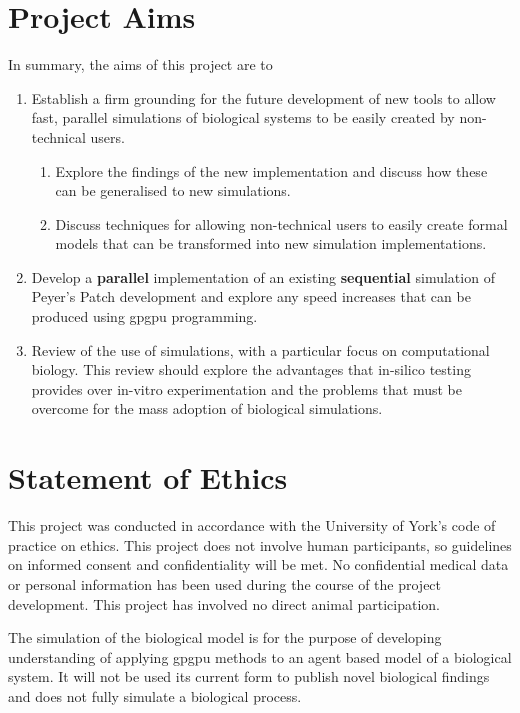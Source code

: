 \documentclass{UoYCSproject}
\begin{document}
\section{Project Aims}
In summary, the aims of this project are to
\begin{enumerate}
	\item Establish a firm grounding for the future development of new tools to allow fast, parallel simulations of biological systems to be easily created by non-technical users.
	\begin{enumerate}
		\item Explore the findings of the new implementation and discuss how these can be generalised to new simulations.
		\item Discuss techniques for allowing non-technical users to easily create formal models that can be transformed into new simulation implementations.
	\end{enumerate}
	\item Develop a \textbf{parallel} implementation of an existing \textbf{sequential} simulation of Peyer's Patch development and explore any speed increases that can be produced using \acrlong{gpgpu} programming.
	\item Review of the use of simulations, with a particular focus on computational biology. This review should explore the advantages that in-silico testing provides over \gls{in-vitro} experimentation and the problems that must be overcome for the mass adoption of biological simulations.
	
\end{enumerate}

\section{Statement of Ethics}
This project was conducted in accordance with the University of York's code of practice on ethics.
This project does not involve human participants, so guidelines on informed consent and confidentiality will be met. No confidential medical data or personal information has been used during the course of the project development. This project has involved no direct animal participation.

The simulation of the biological model is for the purpose of developing understanding of applying \acrshort{gpgpu} methods to an agent based model of a biological system. It will not be used its current form to publish novel biological findings and does not fully simulate a biological process.%
\end{document}
